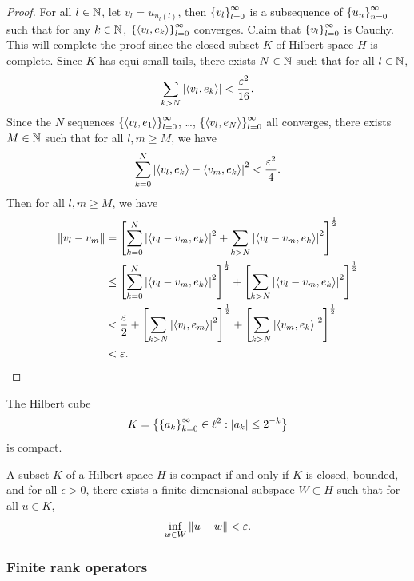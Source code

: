 \documentclass[a4paper]{article}
\begin{document}
\begin{proof}
For all $l \in \mathbb{N}$, let $v_l = u_{n_l(l)}$, then 
$\left\{ v_l \right\}_{l=0}^\infty$ is a subsequence of $\left\{ u_n \right\}_{n=0}^\infty$
such that for any $k \in \mathbb{N}$, 
$\left\{ \left\langle v_l, e_k \right\rangle \right\}_{l=0}^\infty$ converges. Claim that 
$\left\{ v_l \right\}_{l=0}^\infty$ is Cauchy. This will complete the proof 
since the closed subset $K$ of Hilbert space $H$ is complete.
Since $K$ has equi-small tails, there exists $N \in \mathbb{N}$
such that for all $l \in \mathbb{N}$, 
\[
\sum_{k > N} \left\lvert \left\langle v_l, e_k \right\rangle\right\rvert < \frac{\varepsilon^2}{16}.
\]
Since the $N$ sequences $\left\{ \left\langle v_l, e_1 \right\rangle \right\}_{l=0}^\infty$, 
\dots, $\left\{ \left\langle v_l, e_N \right\rangle \right\}_{l=0}^\infty$ all converges, 
there exists $M \in \mathbb{N}$ such that for all $l, m \geq M$, 
we have 
\[
\sum_{k=0}^N \left\lvert \left\langle v_l, e_k \right\rangle - \left\langle v_m, e_k \right\rangle\right\rvert^2 
< \frac{\varepsilon^2}{4}.
\]
Then for all $l, m \geq M$, we have 
\[
\begin{aligned}
  \left\lVert v_l - v_m\right\rVert 
  &= 
  \left[ \sum_{k=0}^N \left\lvert \left\langle v_l - v_m, e_k \right\rangle\right\rvert^2 
  + \sum_{k > N} \left\lvert \left\langle v_l - v_m, e_k \right\rangle\right\rvert^2 \right]^{\frac{1}{2}} \\
  &\leq
  \left[ \sum_{k=0}^N \left\lvert \left\langle v_l - v_m, e_k \right\rangle\right\rvert^2  \right]
  ^{\frac{1}{2}}
  + \left[ \sum_{k > N} \left\lvert \left\langle v_l - v_m, e_k \right\rangle\right\rvert^2 \right]
  ^{\frac{1}{2}} \\ 
  &< \frac{\varepsilon}{2} + \left[ \sum_{k > N} \left\lvert \left\langle v_l, e_m \right\rangle\right\rvert^2 \right]
  ^{\frac{1}{2}} + \left[ \sum_{k > N} \left\lvert \left\langle v_m, e_k \right\rangle\right\rvert^2 \right]
  ^{\frac{1}{2}} \\
  &< \varepsilon. 
\end{aligned}
\]
\end{proof}

\begin{eg}
The Hilbert cube 
\[
K = \left\{ \left\{ a_k \right\}_{k=0}^\infty \in \ell^2 : \left\lvert a_k\right\rvert \leq 2^{-k} \right\}
\]
is compact.
\end{eg}

\begin{thm}
A subset $K$ of a Hilbert space $H$ is compact 
if and only if $K$ is closed, bounded, and for 
all $\epsilon > 0$, there exists a finite dimensional subspace 
$W \subset H$ such that for all $u \in K$, 
\[
\inf_{w \in W} \left\lVert u - w\right\rVert < \varepsilon.
\] 
\end{thm}

\subsubsection*{Finite rank operators}
\end{document}
